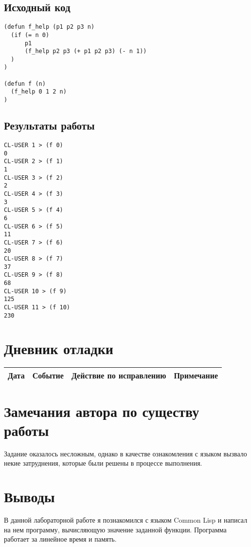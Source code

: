 \documentclass[12pt]{article}
\begin{document}
\subsection{Исходный код}
\begin{lstlisting}
(defun f_help (p1 p2 p3 n)
  (if (= n 0)
      p1
      (f_help p2 p3 (+ p1 p2 p3) (- n 1))
  )
)

(defun f (n)
  (f_help 0 1 2 n)
)
\end{lstlisting}

\subsection{Результаты работы}

\begin{lstlisting}
CL-USER 1 > (f 0)
0
CL-USER 2 > (f 1)
1
CL-USER 3 > (f 2)
2
CL-USER 4 > (f 3)
3
CL-USER 5 > (f 4)
6
CL-USER 6 > (f 5)
11
CL-USER 7 > (f 6)
20
CL-USER 8 > (f 7)
37
CL-USER 9 > (f 8)
68
CL-USER 10 > (f 9)
125
CL-USER 11 > (f 10)
230
\end{lstlisting}

\section{Дневник отладки}
\begin{tabular}{|c|c|c|c|}
\hline
Дата & Событие & Действие по исправлению & Примечание \\
\hline
\end{tabular}

\section{Замечания автора по существу работы}
Задание оказалось несложным, однако в качестве ознакомления с языком вызвало некие затруднения, которые были решены в процессе выполнения.

\section{Выводы}
В данной лабораторной работе я познакомился с языком Common Lisp и написал на нем программу, вычисляющую значение заданной функции. Программа работает за линейное время и память.
\end{document}
